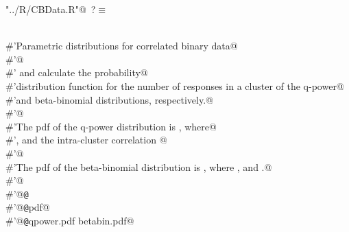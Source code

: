 \documentclass[reqno]{amsart}
\renewcommand{\NWtarget}[2]{\hypertarget{#1}{#2}}
\begin{document}
\begin{flushleft} \small
\begin{minipage}{\linewidth}\label{scrap16}\raggedright\small
\NWtarget{nuweb?}{} \verb@"../R/CBData.R"@\nobreak\ {\footnotesize {?}}$\equiv$
\vspace{-1ex}
\begin{list}{}{} \item
\mbox{}\verb@@\\
\mbox{}\verb@#'Parametric distributions for correlated binary data@\\
\mbox{}\verb@#'@\\
\mbox{}\verb@#' and  calculate the probability@\\
\mbox{}\verb@#'distribution function for the number of responses in a cluster of the q-power@\\
\mbox{}\verb@#'and beta-binomial distributions, respectively.@\\
\mbox{}\verb@#'@\\
\mbox{}\verb@#'The pdf of the q-power distribution is  , where@\\
\mbox{}\verb@#', and the intra-cluster correlation @\\
\mbox{}\verb@#'@\\
\mbox{}\verb@#'The pdf of the beta-binomial distribution is  , where , and .@\\
\mbox{}\verb@#'@\\
\mbox{}\verb@#'@{\tt @}\verb@export@\\
\mbox{}\verb@#'@{\tt @}\verb@name pdf@\\
\mbox{}\verb@#'@{\tt @}\verb@aliases qpower.pdf betabin.pdf@\\

\end{list}
\end{minipage}
\end{flushleft}
\end{document}
